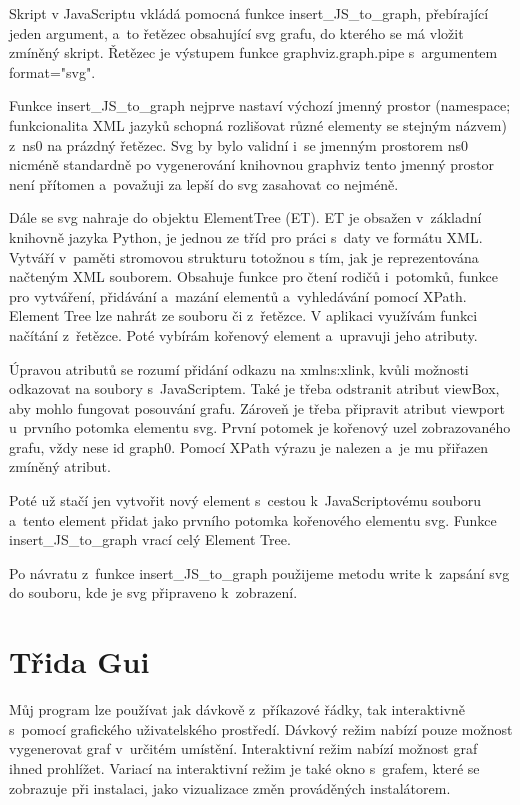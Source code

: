 \documentclass[color,table,oneside,nolot,nolof]{fithesis}
\begin{document}
	Skript v JavaScriptu vkládá pomocná funkce insert\_JS\_to\_graph, přebírající jeden argument, a~to řetězec obsahující svg grafu, do kterého se má vložit zmíněný skript. Řetězec je výstupem funkce
	graphviz.graph.pipe s~argumentem format="svg". 

	Funkce insert\_JS\_to\_graph nejprve nastaví výchozí jmenný prostor (namespace; funkcionalita XML jazyků schopná rozlišovat různé elementy se stejným názvem) z~ns0 na prázdný 
	řetězec. Svg by bylo validní i~se jmenným prostorem ns0 nicméně standardně po vygenerování knihovnou graphviz tento jmenný prostor není přítomen a~považuji za lepší do svg 
	zasahovat co nejméně. 

	Dále se svg nahraje do objektu ElementTree (ET). ET je obsažen v~základní knihovně jazyka Python, je jednou ze tříd pro práci s~daty ve formátu XML. Vytváří v~paměti stromovou
	strukturu totožnou s tím, jak je reprezentována načteným XML souborem. Obsahuje funkce pro čtení rodičů i~potomků, funkce pro vytváření, přidávání a~mazání elementů a~vyhledávání pomocí 
	XPath. Element Tree lze nahrát ze souboru či z~řetězce. V aplikaci využívám funkci načítání z~řetězce. Poté vybírám kořenový element a~upravuji jeho atributy.

	Úpravou atributů se rozumí přidání odkazu na xmlns:xlink, kvůli možnosti odkazovat na soubory s~JavaScriptem. Také je třeba odstranit atribut viewBox, aby mohlo fungovat posouvání
	grafu. Zároveň je třeba připravit atribut viewport u~prvního potomka elementu svg. První potomek je kořenový uzel zobrazovaného grafu, vždy nese id graph0. Pomocí XPath výrazu je
	nalezen a~je mu  přiřazen zmíněný atribut.

	Poté už stačí jen vytvořit nový element s~cestou k~JavaScriptovému souboru a~tento element přidat jako prvního potomka kořenového elementu svg. Funkce insert\_JS\_to\_graph vrací celý
	Element Tree.

	Po návratu z~funkce insert\_JS\_to\_graph použijeme metodu write k~zapsání svg do souboru, kde je svg připraveno k~zobrazení.

\section{Třida Gui}
	Můj program lze používat jak dávkově z~příkazové řádky, tak interaktivně s~pomocí grafického uživatelského prostředí. Dávkový režim nabízí pouze možnost vygenerovat graf v~určitém 
	umístění. Interaktivní režim nabízí možnost graf ihned prohlížet. Variací na interaktivní režim je také okno s~grafem, které se zobrazuje při instalaci, jako vizualizace změn prováděných
	instalátorem. 
\end{document}
